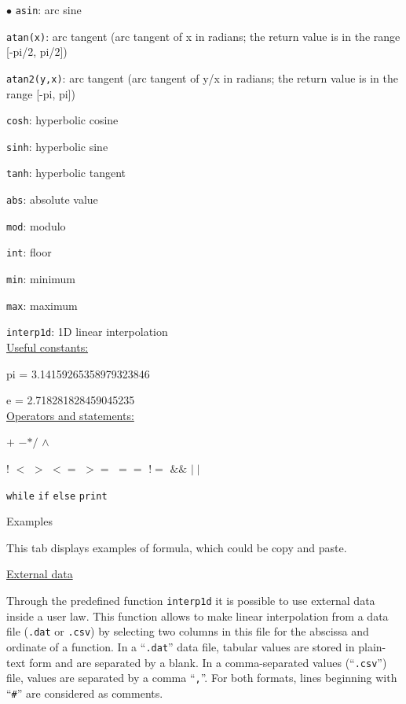 {{{\begin{list}{$\bullet$}{}
\texttt{asin}: arc sine

\texttt{atan(x)}: arc tangent (arc tangent of x in radians; the return value is in the range [-pi/2, pi/2])

\texttt{atan2(y,x)}: arc tangent (arc tangent of y/x in radians; the return value is in the range [-pi, pi])

\texttt{cosh}: hyperbolic cosine

\texttt{sinh}: hyperbolic sine

\texttt{tanh}: hyperbolic tangent

\texttt{abs}: absolute value

\texttt{mod}: modulo

\texttt{int}: floor

\texttt{min}: minimum

\texttt{max}: maximum

\texttt{interp1d}: 1D linear interpolation\\


\underline{Useful constants:}

pi = 3.14159265358979323846

e = 2.718281828459045235\\


\underline{Operators and statements:}

$+$ \qquad$-$\qquad $*$\qquad $/$ \qquad$\wedge$

! \qquad $<$ \qquad $>$ \qquad $<=$ \qquad $>=$ \qquad $==$ \qquad $!=$ \qquad $\&\&$ \qquad $\mid\mid$

\texttt{while} \texttt{if} \texttt{else} \texttt{print}


\item Examples

This tab displays examples of formula, which could be copy and paste.

\end{list}

\underline{External data}

Through the predefined function \texttt{interp1d} it is possible to use
external data inside a user law. This function allows to make linear interpolation
from a data file (\texttt{.dat} or \texttt{.csv}) by selecting two columns in this file
for the abscissa and ordinate of a function. In a ``\texttt{.dat}'' data file, tabular
values are stored in plain-text form and are separated by a blank. In a comma-separated values
(``\texttt{.csv}'') file, values are separated by a comma ``\texttt{,}''.
For both formats, lines beginning with ``\texttt{\#}'' are considered as comments.

}}}
